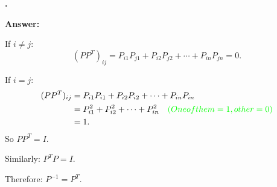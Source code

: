\documentclass[11pt]{article}
\newcounter{ej}
\renewcommand{\theej}{\textbf{\arabic{ej}.}}
\newenvironment{ej}{
    \stepcounter{ej}
    \begin{list}{\theej}{
        \setlength{\itemindent}{0ex}
        \setlength{\labelwidth}{4ex}
        \setlength{\labelsep}{0.5ex}
        \setlength{\leftmargin}{4ex}
        \setlength{\listparindent}{0ex}
        \setlength{\topsep}{3mm plus 0.5mm minus 0.5mm}
        \setlength{\parsep}{0mm}
        \setlength{\itemsep}{1mm plus 0.3mm minus 0.3mm}
        \setlength{\rightmargin}{0ex}
    }
    \item
}{\end{list}}
\newenvironment{sol}{
    \def\FrameCommand##1{\fcolorbox{black}{gray!20}{##1}}%
    \MakeFramed{\advance\hsize-\width \FrameRestore}%
    \noindent\textbf{Answer:} \ignorespaces
}{\endMakeFramed}
\begin{document}
\begin{ej}
\begin{sol}
            If $i\ne j$:
            \[
                (PP^T)_{ij}
                =P_{i1}P_{j1}+P_{i2}P_{j2}+\cdots+P_{in}P_{jn}=0.
            \]

            If $i=j$:
            \begin{align*}
                (PP^T)_{ij}
                    &=P_{i1}P_{i1}+P_{i2}P_{i2}+\cdots+P_{in}P_{in}\\
                    &=P_{i1}^2+P_{i2}^2+\cdots+P_{in}^2
                    \quad\textcolor{green}{(One of them = 1, other = 0)}\\
                    &=1.
            \end{align*}
            So $PP^T=I$.

            Similarly: $P^TP=I$.

            Therefore: $P^{-1}=P^T$.
        \end{sol}
    \end{ej}
\end{document}
